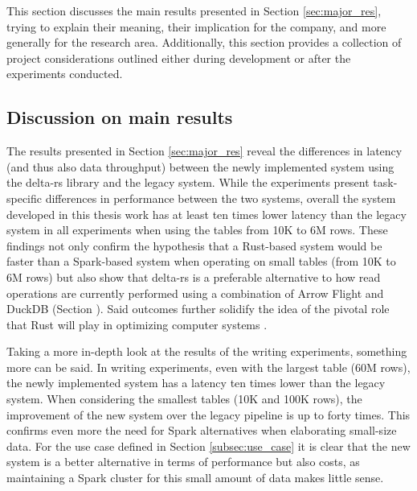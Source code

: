 This section discusses the main results presented in Section \ref{sec:major_res}, trying to explain their meaning, their implication for the company, and more generally for the research area. Additionally, this section provides a collection of project considerations outlined either during development or after the experiments conducted.

\subsection{Discussion on main results}

The results presented in Section \ref{sec:major_res} reveal the differences in latency (and thus also data throughput) between the newly implemented system using the delta-rs library and the legacy system. While the experiments present task-specific differences in performance between the two systems, overall the system developed in this thesis work has at least ten times lower latency than the legacy system in all experiments when using the tables from 10K to 6M rows. These findings not only confirm the hypothesis that a Rust-based system would be faster than a Spark-based system when operating on small tables (from 10K to 6M rows) but also show that delta-rs is a preferable alternative to how read operations are currently performed using a combination of Arrow Flight and DuckDB (Section ). Said outcomes further solidify the idea of the pivotal role that Rust will play in optimizing computer systems \cite{Balasub2017}.

Taking a more in-depth look at the results of the writing experiments, something more can be said. In writing experiments, even with the largest table (60M rows), the newly implemented system has a latency ten times lower than the legacy system. When considering the smallest tables (10K and 100K rows), the improvement of the new system over the legacy pipeline is up to forty times. This confirms even more the need for Spark alternatives when elaborating small-size data. For the use case defined in Section \ref{subsec:use_case} it is clear that the new system is a better alternative in terms of performance but also costs, as maintaining a Spark cluster for this small amount of data makes little sense. 

